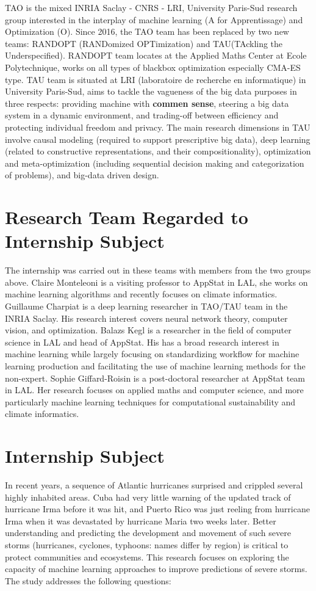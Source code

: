 TAO is the mixed INRIA Saclay - CNRS - LRI, University Paris-Sud research group interested in the interplay of machine learning (A for Apprentissage) and Optimization (O). Since 2016, the TAO team has been replaced by two new teams: RANDOPT (RANDomized OPTimization) and TAU(TAckling the Underspecified). RANDOPT team locates at the Applied Maths Center at Ecole Polytechnique, works on all types of blackbox optimization especially CMA-ES type. TAU team is situated at LRI (laboratoire de recherche en informatique) in University Paris-Sud, aims to tackle the vagueness of the big data purposes\cite{TAO} in three respects: providing machine with \textbf{commen sense}, steering a big data system in a dynamic environment, and trading-off between efficiency and protecting individual freedom and privacy\cite{TAU}. The main research dimensions in TAU involve causal modeling (required to support prescriptive big data), deep learning (related to constructive representations, and their compositionality), optimization and meta-optimization (including sequential decision making and categorization of problems), and big-data driven design.


\section{Research Team Regarded to Internship Subject}
The internship was carried out in these teams with members from the two groups above. Claire Monteleoni is a visiting professor to AppStat in LAL, she works on machine learning algorithms and recently focuses on climate informatics. Guillaume Charpiat is a deep learning researcher in TAO/TAU team in the INRIA Saclay. His research interest covers neural network theory, computer vision, and optimization. Balazs Kegl is a researcher in the field of computer science in LAL and head of AppStat. His has a broad research interest in machine learning while largely focusing on standardizing workflow for machine learning production and facilitating the use of machine learning methods for the non-expert. Sophie Giffard-Roisin is a post-doctoral researcher at AppStat team in LAL. Her research focuses on applied maths and computer science, and more particularly machine learning techniques for computational sustainability and climate informatics.  


\section{Internship Subject}
\label{sec:subject}
In recent years, a sequence of Atlantic hurricanes surprised and crippled several highly inhabited areas. Cuba had very little warning of the updated track of hurricane Irma before it
was hit\cite{NYT}, and Puerto Rico was just reeling from hurricane Irma when it was devastated by hurricane Maria two weeks later. Better understanding and predicting the development and movement of such severe storms (hurricanes, cyclones, typhoons: names differ by region) is critical to protect communities and ecosystems. This research focuses on exploring the capacity of machine learning approaches to improve predictions of severe storms. The study addresses the following questions:



